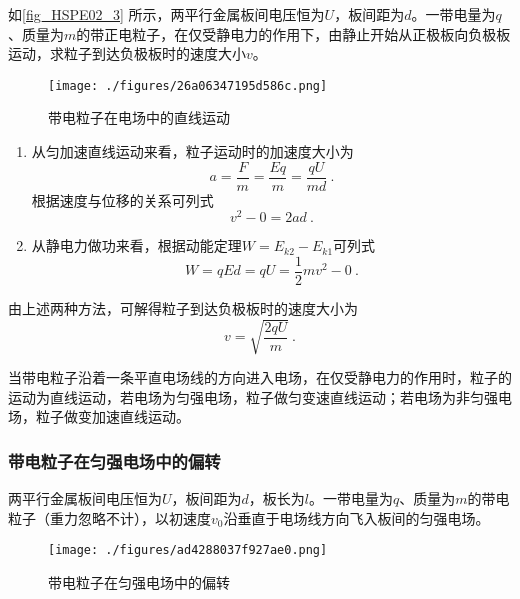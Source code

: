 \begin{example}{}
如\autoref{fig_HSPE02_3} 所示，两平行金属板间电压恒为$U$，板间距为$d$。一带电量为$q$、质量为$m$的带正电粒子，在仅受静电力的作用下，由静止开始从正极板向负极板运动，求粒子到达负极板时的速度大小$v$。

\begin{figure}[ht]
\centering
\texttt{[image: ./figures/26a06347195d586c.png]}
\caption{带电粒子在电场中的直线运动} \label{fig_HSPE02_3}
\end{figure}

\begin{enumerate}
\item 从匀加速直线运动来看，粒子运动时的加速度大小为
\begin{equation}
a = \frac{F}{m} = \frac{Eq}{m} = \frac{qU}{md}~.
\end{equation}
根据速度与位移的关系可列式
\begin{equation}
v^2 - 0 = 2ad~.
\end{equation}

\item 从静电力做功来看，根据动能定理$W=E_{k2}-E_{k1}$可列式
\begin{equation}
W=qEd=qU=\frac12 mv^2 - 0~.
\end{equation}
\end{enumerate}

由上述两种方法，可解得粒子到达负极板时的速度大小为
\begin{equation}\label{eq_HSPE02_2}
v = \sqrt{\frac{2qU}{m}}~.
\end{equation}

\end{example}

当带电粒子沿着一条平直电场线的方向进入电场，在仅受静电力的作用时，粒子的运动为直线运动，若电场为匀强电场，粒子做匀变速直线运动；若电场为非匀强电场，粒子做变加速直线运动。

\subsubsection{带电粒子在匀强电场中的偏转}

两平行金属板间电压恒为$U$，板间距为$d$，板长为$l$。一带电量为$q$、质量为$m$的带电粒子（重力忽略不计），以初速度$v_0$沿垂直于电场线方向飞入板间的匀强电场。

\begin{figure}[ht]
\centering
\texttt{[image: ./figures/ad4288037f927ae0.png]}
\caption{带电粒子在匀强电场中的偏转} \label{fig_HSPE02_4}
\end{figure}


